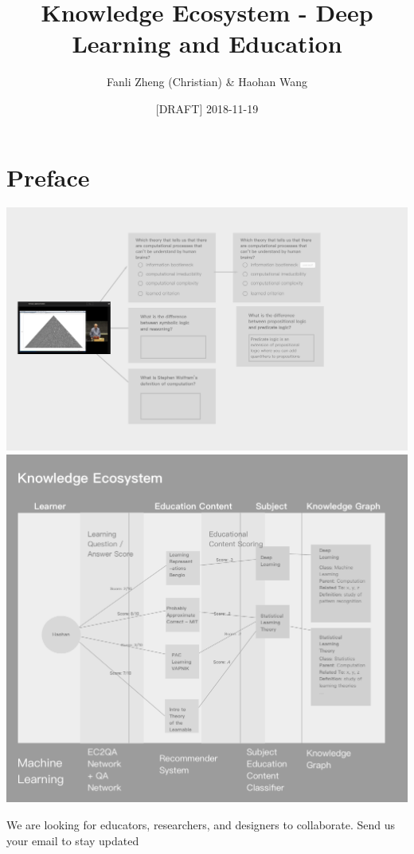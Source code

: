 \documentclass[]{book}
\title{Knowledge Ecosystem - Deep Learning and Education}
\author{Fanli Zheng (Christian) \& Haohan Wang}
\date{{[}DRAFT{]} 2018-11-19}
\theoremstyle{definition}
\theoremstyle{definition}
\theoremstyle{definition}
\theoremstyle{remark}
\begin{document}
\maketitle

{
\hypersetup{linkcolor=black}
\setcounter{tocdepth}{1}
\tableofcontents
}
\chapter*{Preface}\label{preface}

\includegraphics{img/MtoQA.png}
\includegraphics{img/knowledgeEcosystem.png}

\hypertarget{mc_embed_signup}{}
\hypertarget{mc_embed_signup_scroll}{}
We are looking for educators, researchers, and designers to collaborate.
Send us your email to stay updated
\end{document}
